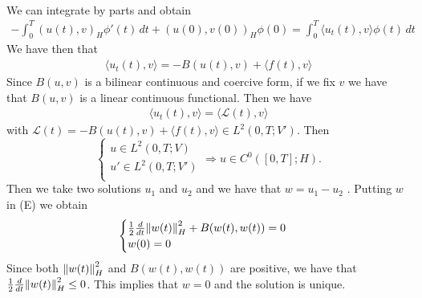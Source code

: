 \begin{enumerate}
\[\begin{split}
        \end{split}
    \]
    We can integrate by parts and obtain
    \[
        \begin{split}
            -\int_0^T \left(u(t), v\right)_H \phi'(t) \, dt + \left(u(0), v(0)\right)_H \phi(0) = \int_0^T \langle u_t(t), v \rangle \phi(t) \, dt 
        \end{split}
    \]
    We have then that 
    \[
        \begin{split}
            \langle u_t(t), v \rangle = - B(u(t), v) + \langle f(t), v \rangle
        \end{split}
    \]
    Since \(B(u,v)\) is a bilinear continuous and coercive form, if we fix \(v\) we have that \(B(u, v)\) is a linear continuous functional. Then we have 
    \[
        \begin{split}
            \langle u_t(t), v \rangle = \langle \mathcal{L}(t), v \rangle
        \end{split}
    \]
    with \(\mathcal{L}(t) = -B(u(t), v) + \langle f(t), v \rangle \in L^2(0, T; V')\). Then 
    \[
    \begin{cases}
        u \in L^2(0, T; V) \\
        u' \in L^2(0, T; V') \\
    \end{cases}
    \Rightarrow u \in C^0([0, T]; H). 
    \]
    Then we take two solutions \(u_1\) and \(u_2\) and we have that \(w = u_1 - u_2\) . Putting \(w\) in (E) we obtain
    \[
        \begin{cases}
            \frac{1}{2} \frac{d}{dt} \norm{w(t)}_H^2 + B(w(t), w(t)) = 0 \\
            w(0) = 0
        \end{cases} 
    \]
    Since both \(\norm{w(t)}_H^2\) and \(B(w(t), w(t))\) are positive, we have that \(\frac{1}{2} \frac{d}{dt} \norm{w(t)}_H^2 \leq 0\). This implies that \(w = 0\) and the solution is unique.
\end{enumerate}

